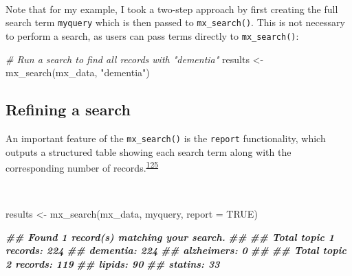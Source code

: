 \documentclass[a4paper, twoside]{templates/ociamthesis}
\newenvironment{Shaded}{\begin{snugshade}}{\end{snugshade}}
\newcommand{\AttributeTok}[1]{\textcolor[rgb]{0.77,0.63,0.00}{#1}}
\newcommand{\CommentTok}[1]{\textcolor[rgb]{0.56,0.35,0.01}{\textit{#1}}}
\newcommand{\ConstantTok}[1]{\textcolor[rgb]{0.00,0.00,0.00}{#1}}
\newcommand{\DocumentationTok}[1]{\textcolor[rgb]{0.56,0.35,0.01}{\textbf{\textit{#1}}}}
\newcommand{\FunctionTok}[1]{\textcolor[rgb]{0.00,0.00,0.00}{#1}}
\newcommand{\NormalTok}[1]{#1}
\newcommand{\OtherTok}[1]{\textcolor[rgb]{0.56,0.35,0.01}{#1}}
\newcommand{\StringTok}[1]{\textcolor[rgb]{0.31,0.60,0.02}{#1}}
\renewenvironment{Shaded}
{
  \vspace{4pt}%
  \begin{snugshade}%
}{%
  \end{snugshade}%
  \vspace{4pt}%
}
\begin{document}
~

Note that for my example, I took a two-step approach by first creating the full search term \texttt{myquery} which is then passed to \texttt{mx\_search()}. This is not necessary to perform a search, as users can pass terms directly to \texttt{mx\_search()}:

\begin{Shaded}
\begin{Highlighting}[]
\CommentTok{\# Run a search to find all records with "dementia"}
\NormalTok{results }\OtherTok{\textless{}{-}} \FunctionTok{mx\_search}\NormalTok{(mx\_data,}
                     \StringTok{"dementia"}\NormalTok{)}
\end{Highlighting}
\end{Shaded}

\hypertarget{refining-a-search}{%
\subsection{Refining a search}\label{refining-a-search}}

An important feature of the \texttt{mx\_search()} is the \texttt{report} functionality, which outputs a structured table showing each search term along with the corresponding number of records.\textsuperscript{\protect\hyperlink{ref-rethlefsen2021prisma}{125}}

~

\begin{Shaded}
\begin{Highlighting}[]
\NormalTok{results  }\OtherTok{\textless{}{-}} \FunctionTok{mx\_search}\NormalTok{(mx\_data,}
\NormalTok{                      myquery,}
                      \AttributeTok{report =} \ConstantTok{TRUE}\NormalTok{)}
\end{Highlighting}
\end{Shaded}

\begin{Shaded}
\begin{Highlighting}[]
\DocumentationTok{\#\# Found 1 record(s) matching your search.}
\DocumentationTok{\#\# }
\DocumentationTok{\#\# Total topic 1 records: 224}
\DocumentationTok{\#\# dementia: 224}
\DocumentationTok{\#\# alzheimer\textquotesingle{}s: 0}
\DocumentationTok{\#\# }
\DocumentationTok{\#\# Total topic 2 records: 119}
\DocumentationTok{\#\# lipids: 90}
\DocumentationTok{\#\# statins: 33}
\end{Highlighting}
\end{Shaded}
\end{document}
